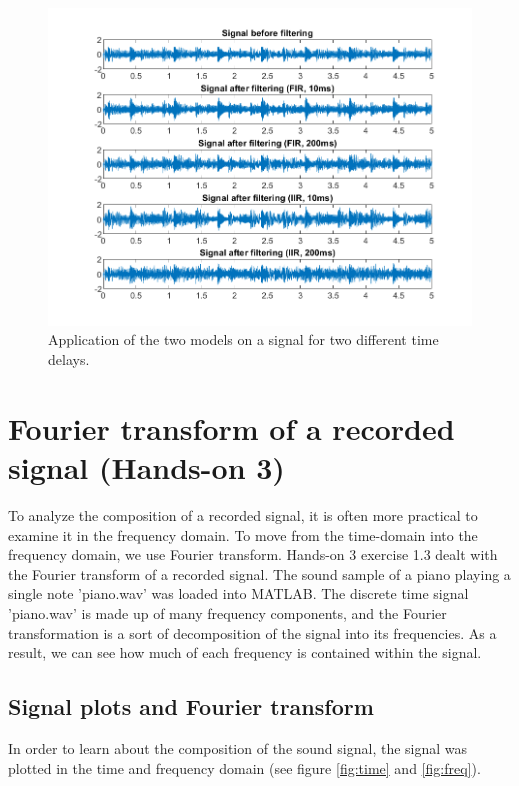 \documentclass[journal]{IEEEtran}
\begin{document}
\begin{figure}
    \centering
    \includegraphics[width=\linewidth]{assignment_01/plots/bounce_signals.png}
    \caption{Application of the two models on a signal for two different time delays.}
    \label{fig:bounce:signals}
\end{figure}


\section{Fourier transform of a recorded signal (Hands-on 3)}
To analyze the composition of a recorded signal, it is often more practical to examine it in the frequency domain. To move from the time-domain into the frequency domain, we use Fourier transform. 
Hands-on 3 exercise 1.3 dealt with the Fourier transform of a recorded signal. The sound sample of a piano playing a single note 'piano.wav' was loaded into MATLAB. The discrete time signal 'piano.wav' is made up of many frequency components, and the Fourier transformation is a sort of decomposition of the signal into its frequencies. As a result, we can see how much of each frequency is contained within the signal.


\subsection{Signal plots and Fourier transform}
In order to learn about the composition of the sound signal, the signal was plotted in the time and frequency domain (see figure \ref{fig:time} and \ref{fig:freq}). 
\end{document}
